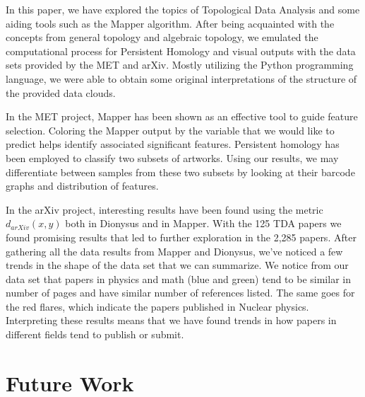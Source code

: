 \documentclass[12pt]{article}
\theoremstyle{definition}
\begin{document}
In this paper, we have explored the topics of Topological Data Analysis and some aiding tools such as the Mapper algorithm. After being acquainted with the concepts from general topology and algebraic topology, we emulated the computational process for Persistent Homology and visual outputs with the data sets provided by the MET and arXiv. Mostly utilizing the Python programming language, we were able to obtain some original interpretations of the structure of the provided data clouds. 
\newline
\par In the MET project, Mapper has been shown as an effective tool to guide feature selection. Coloring the Mapper output by the variable that we would like to predict helps identify associated significant features. Persistent homology has been employed to classify two subsets of artworks. Using our results, we may differentiate between samples from these two subsets by looking at their barcode graphs and distribution of features.
\newline
\par In the arXiv project, interesting results have been found using the metric $d_{arXiv}(x,y)$ both in Dionysus and in Mapper. With the 125 TDA papers we found promising results that led to further exploration in the 2,285 papers. After gathering all the data results from Mapper and Dionysus, we've noticed a few trends in the shape of the data set that we can summarize. We notice from our data set that papers in physics and math (blue and green) tend to be similar in number of pages and have similar number of references listed. The same goes for the red flares, which indicate the papers published in Nuclear physics. Interpreting these results means that we have found trends in how papers in different fields tend to publish or submit.  

\section{Future Work}
\end{document}
